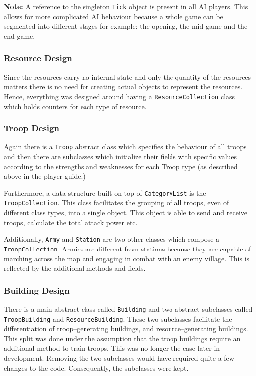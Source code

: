 \documentclass[12pt]{article}
\begin{document}
\textbf{Note:} A reference to the singleton \texttt{Tick} object
is present in all AI players. This allows for more complicated
AI behaviour because a whole game can be segmented into
different stages for example: the opening, the mid-game and the
end-game.

\subsubsection{Resource Design}

Since the resources carry no internal state and only the
quantity of the resources matters there is no need for creating
actual objects to represent the resources. Hence, everything was
designed around having a \texttt{ResourceCollection} class which
holds counters for each type of resource.

\subsubsection{Troop Design}

Again there is a \texttt{Troop} abstract class which specifies
the behaviour of all troops and then there are subclasses which
initialize their fields with specific values according to the
strengths and weaknesses for each Troop type (as described above
in the player guide.)

Furthermore, a data structure built on top of
\texttt{CategoryList} is the \texttt{TroopCollection}. This
class facilitates the grouping of all troops, even of different
class types, into a single object. This object is able to send
and receive troops, calculate the total attack power etc.

Additionally, \texttt{Army} and \texttt{Station} are two other
classes which compose a \texttt{TroopCollection}. Armies are
different from stations because they are capable of marching
across the map and engaging in combat with an enemy village.
This is reflected by the additional methods and fields.

\subsubsection{Building Design}

There is a main abstract class called \texttt{Building} and two
abstract subclasses called \texttt{TroopBuilding} and
\texttt{ResourceBuilding}. These two subclasses facilitate the
differentiation of troop--generating buildings, and
resource--generating buildings. This split was done under the
assumption that the troop buildings require an additional method
to train troops. This was no longer the case later in
development. Removing the two subclasses would have required
quite a few changes to the code. Consequently, the subclasses
were kept.
\end{document}
